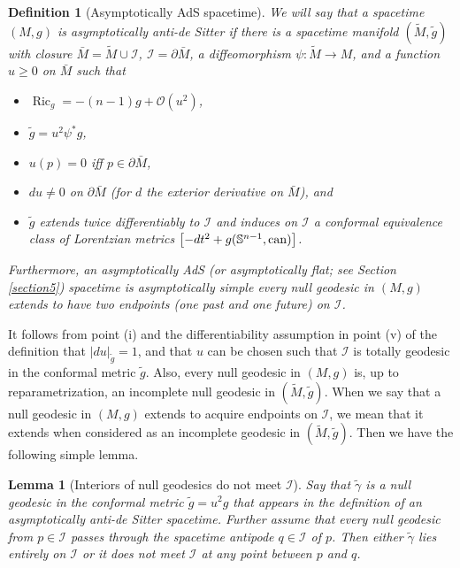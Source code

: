 \documentclass[12pt]{amsart}
\numberwithin{equation}{section}
\newtheorem{lemma}[theorem]{Lemma}
\newtheorem{definition}[theorem]{Definition}
\DeclareMathOperator{\ric}{Ric}
\begin{document}
\begin{definition}[Asymptotically AdS spacetime]\label{definition2.1}
We will say that a spacetime $(M,g)$ is \emph{asymptotically anti-de Sitter} if there is a spacetime manifold $({\tilde M}, {\tilde g})$ with closure ${\bar M}={\tilde M}\cup {\mathcal I}$, ${\mathcal I}=\partial {\bar M}$, a diffeomorphism $\psi:{\tilde M}\to M$, and a function $u \ge 0$ on ${\bar M}$ such that
\begin{itemize}
\item [i)] $\ric_g=-(n-1)g+{\mathcal O}(u^2)$,
\item [ii)] ${\tilde g}=u^2 \psi^*g$,
\item [iii)] $u(p)=0$ iff $p\in \partial {\bar M}$,
\item [iv)] $du\neq 0$ on $\partial {\bar M}$ (for $d$ the exterior derivative on ${\bar M}$), and
\item [v)] ${\tilde g}$ extends twice differentiably to ${\mathcal I}$ and induces on ${\mathcal I}$ a conformal equivalence class of Lorentzian metrics $\left [-dt^2+g({\mathbb S}^{n-1},{\rm can})\right ]$.
\end{itemize}
Furthermore, an asymptotically AdS (or asymptotically flat; see Section \ref{section5}) spacetime is \emph{asymptotically simple} every null geodesic in $(M,g)$ extends to have two endpoints (one past and one future) on ${\mathcal I}$.
\end{definition}
It follows from point (i) and the differentiability assumption in point (v) of the definition that $|du|_{\tilde g}=1$, and that $u$ can be chosen such that ${\mathcal I}$ is totally geodesic in the conformal metric ${\tilde g}$. Also, every null geodesic in $(M,g)$ is, up to reparametrization, an incomplete null geodesic in $({\tilde M},{\tilde g})$. When we say that a null geodesic in $(M,g)$ extends to acquire endpoints on ${\mathcal I}$, we mean that it extends when considered as an incomplete geodesic in $({\tilde M},{\tilde g})$. Then we have the following simple lemma.

\begin{lemma}[Interiors of null geodesics do not meet ${\mathcal I}$]\label{lemma2.2}
Say that ${\tilde \gamma}$ is a null geodesic in the conformal metric ${\tilde g}=u^2 g$ that appears in the definition of an asymptotically anti-de Sitter spacetime. Further assume that every null geodesic from $p\in{\mathcal I}$ passes through the spacetime antipode $q\in{\mathcal I}$ of $p$. Then either ${\tilde \gamma}$ lies entirely on ${\mathcal I}$ or it does not meet ${\mathcal I}$ at any point between $p$ and $q$.
\end{lemma}
\end{document}
